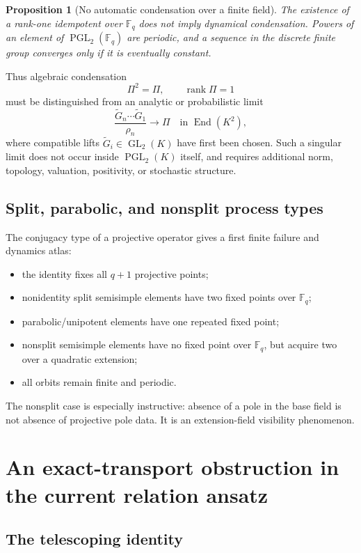 \documentclass[11pt]{article}
\newtheorem{proposition}[theorem]{Proposition}
\theoremstyle{definition}
\theoremstyle{remark}
\newcommand{\PGL}{\operatorname{PGL}}
\newcommand{\GL}{\operatorname{GL}}
\newcommand{\F}{\mathbb F}
\begin{document}
\begin{proposition}[No automatic condensation over a finite field]
The existence of a rank-one idempotent over \(\F_q\) does not imply dynamical
condensation.  Powers of an element of \(\PGL_2(\F_q)\) are periodic, and a
sequence in the discrete finite group converges only if it is eventually
constant.
\end{proposition}

Thus algebraic condensation
\[
\Pi^2=\Pi,\qquad\operatorname{rank}\Pi=1
\]
must be distinguished from an analytic or probabilistic limit
\[
\frac{\widetilde G_n\cdots \widetilde G_1}{\rho_n}
\longrightarrow\Pi
\quad\text{in }\operatorname{End}(K^2),
\]
where compatible lifts \(\widetilde G_i\in\GL_2(K)\) have first been chosen.
Such a singular limit does not occur inside \(\PGL_2(K)\) itself, and requires
additional norm, topology, valuation, positivity, or stochastic structure.

\subsection{Split, parabolic, and nonsplit process types}

The conjugacy type of a projective operator gives a first finite failure and
dynamics atlas:
\begin{itemize}
  \item the identity fixes all \(q+1\) projective points;
  \item nonidentity split semisimple elements have two fixed points over
  \(\F_q\);
  \item parabolic/unipotent elements have one repeated fixed point;
  \item nonsplit semisimple elements have no fixed point over \(\F_q\), but
  acquire two over a quadratic extension;
  \item all orbits remain finite and periodic.
\end{itemize}
The nonsplit case is especially instructive: absence of a pole in the base
field is not absence of projective pole data.  It is an extension-field
visibility phenomenon.

\section{An exact-transport obstruction in the current relation ansatz}

\subsection{The telescoping identity}
\end{document}
